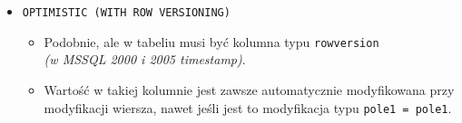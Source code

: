 \begin{itemize}
    \pagebreak
    \item \texttt{OPTIMISTIC (WITH ROW VERSIONING)}
    \begin{itemize}
        \item Podobnie, ale w tabeliu musi być kolumna typu
        \texttt{rowversion}\\
        \textit{(w MSSQL 2000 i 2005 timestamp)}.
        \item Wartość w takiej kolumnie jest zawsze automatycznie
        modyfikowana przy modyfikacji wiersza, nawet jeśli jest to
        modyfikacja typu \texttt{pole1 = pole1}.
    \end{itemize}

\end{itemize}
